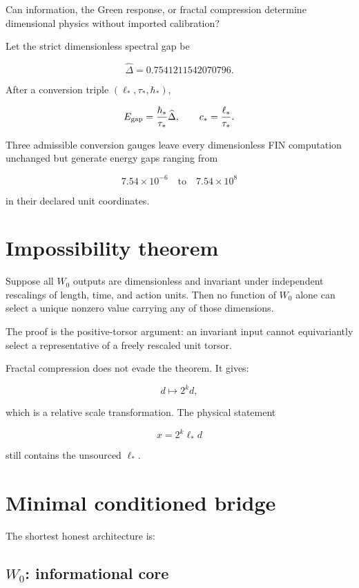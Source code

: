 \documentclass[11pt,a4paper,openany]{report}
\begin{document}
Can information, the Green response, or fractal compression determine dimensional physics without imported calibration?

Let the strict dimensionless spectral gap be

\[
\widehat\Delta=0.7541211542070796.
\]

After a conversion triple \((\ell_*,\tau_*,\hbar_*)\),

\[
E_{\rm gap}=\frac{\hbar_*}{\tau_*}\widehat\Delta,
\qquad
c_*=\frac{\ell_*}{\tau_*}.
\]

Three admissible conversion gauges leave every dimensionless FIN computation unchanged but generate energy gaps ranging from

\[
7.54\times10^{-6}
\quad\text{to}\quad
7.54\times10^8
\]

in their declared unit coordinates.

\section{Impossibility theorem}

Suppose all \(W_0\) outputs are dimensionless and invariant under independent rescalings of length, time, and action units. Then no function of \(W_0\) alone can select a unique nonzero value carrying any of those dimensions.

The proof is the positive-torsor argument: an invariant input cannot equivariantly select a representative of a freely rescaled unit torsor.

Fractal compression does not evade the theorem. It gives:

\[
d\mapsto 2^k d,
\]

which is a relative scale transformation. The physical statement

\[
x=2^k\ell_*d
\]

still contains the unsourced \(\ell_*\).

\section{Minimal conditioned bridge}

The shortest honest architecture is:

\subsection{\texorpdfstring{\(W_0\): informational core}{W\_0: informational core}}
\end{document}

